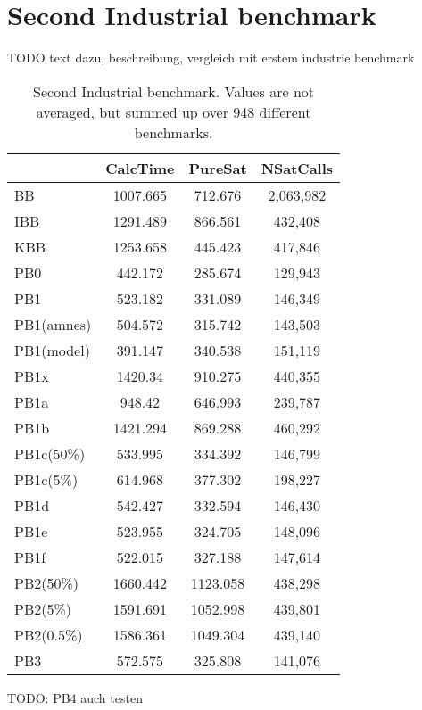 \section{Second Industrial benchmark}

TODO text dazu, beschreibung, vergleich mit erstem industrie benchmark

\begin{wraptable}{R}{8cm}
\begin{tabular}{l| c c c }

 & CalcTime & PureSat & NSatCalls \\
 \hline
BB & 1007.665 & 712.676 & 2,063,982 \\
IBB & 1291.489 & 866.561 & 432,408 \\
KBB & 1253.658 & 445.423 & 417,846 \\
PB0 & 442.172 & 285.674 & 129,943 \\
PB1 & 523.182 & 331.089 & 146,349 \\
PB1(amnes) & 504.572 & 315.742 & 143,503 \\
PB1(model) & 391.147 & 340.538 & 151,119 \\
PB1x & 1420.34 & 910.275 & 440,355 \\
PB1a & 948.42 & 646.993 & 239,787 \\
PB1b & 1421.294 & 869.288 & 460,292 \\
PB1c(50\%) & 533.995 & 334.392 & 146,799 \\
PB1c(5\%) & 614.968 & 377.302 & 198,227 \\
PB1d & 542.427 & 332.594 & 146,430 \\
PB1e & 523.955 & 324.705 & 148,096 \\
PB1f & 522.015 & 327.188 & 147,614 \\
PB2(50\%) & 1660.442 & 1123.058 & 438,298 \\
PB2(5\%) & 1591.691 & 1052.998 & 439,801 \\
PB2(0.5\%) & 1586.361 & 1049.304 & 439,140 \\
PB3 & 572.575 & 325.808 & 141,076 \\

\end{tabular}
\caption{Second Industrial benchmark. Values are not averaged, but summed up over 948 different benchmarks.}
\label{tab:vonThore2pof} %
\end{wraptable}

TODO: PB4 auch testen